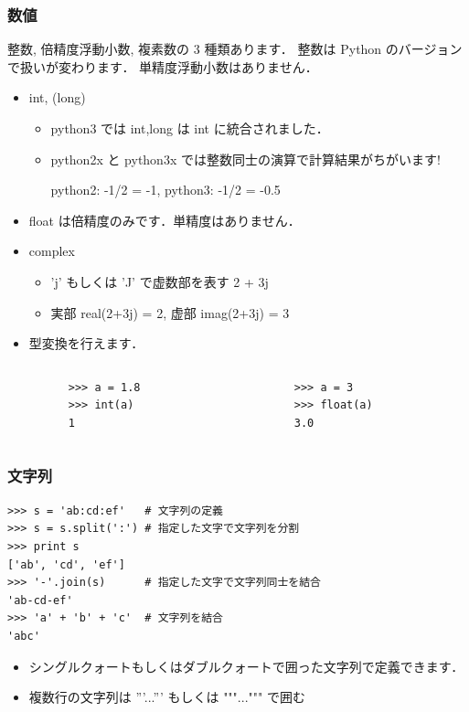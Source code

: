 \begin{frame}
\frametitle{数値}

整数, 倍精度浮動小数, 複素数の 3 種類あります．
\alert{整数は Python のバージョンで扱いが変わります．}
単精度浮動小数はありません．

\begin{itemize}
 \item int, (long)
       \begin{itemize}
	\item python3 では int,long は int に統合されました．
	\item \alert{python2x と python3x では整数同士の演算で計算結果がちがいます!}

	      python2:  -1/2 = -1, python3: -1/2 = -0.5

       \end{itemize}
 \item float は倍精度のみです．単精度はありません．
 \item complex
       \begin{itemize}
	\item 'j' もしくは 'J' で虚数部を表す 2 + 3j
	\item 実部 real(2+3j) = 2, 虚部 imag(2+3j) = 3  
       \end{itemize}
 \item 型変換を行えます．

       \begin{columns}
	\begin{column}{4cm}
	 \begin{lstlisting}
	  >>> a = 1.8
	  >>> int(a)
	  1
	 \end{lstlisting}	 
	\end{column}
	\begin{column}{4cm}
	 \begin{lstlisting}
	  >>> a = 3
	  >>> float(a)
	  3.0
	 \end{lstlisting}	 
	\end{column}
       \end{columns}
\end{itemize}

\end{frame}

\begin{frame}[t,fragile]
\frametitle{文字列}

\begin{lstlisting}
>>> s = 'ab:cd:ef'   # 文字列の定義
>>> s = s.split(':') # 指定した文字で文字列を分割
>>> print s
['ab', 'cd', 'ef']
>>> '-'.join(s)      # 指定した文字で文字列同士を結合
'ab-cd-ef'
>>> 'a' + 'b' + 'c'  # 文字列を結合
'abc'
\end{lstlisting}

\begin{itemize}
  \item シングルクォートもしくはダブルクォートで囲った文字列で定義できます．
  \item 複数行の文字列は '''...''' もしくは """...""" で囲む
\end{itemize}
\end{frame}


